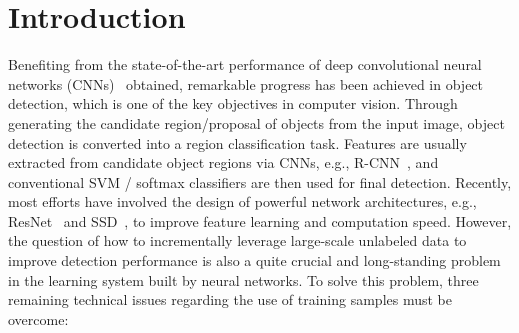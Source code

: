 \documentclass[journal]{IEEEtran}
\begin{document}
 \section{Introduction}
Benefiting from the state-of-the-art performance of deep convolutional neural networks (CNNs)~\cite{alexnet12NIPS,googlenet,He_2016_CVPR} obtained, remarkable progress has been achieved in object detection, which is one of the key objectives in computer vision. Through generating the candidate region/proposal of objects from the input image, object detection is converted into a region classification task. Features are usually extracted from candidate object regions via CNNs, e.g., R-CNN~\cite{rcnn14CVPR}, and conventional SVM / softmax classifiers are then used for final detection. Recently, most efforts have involved the design of powerful network architectures, e.g., ResNet~\cite{He_2016_CVPR} and SSD~\cite{ssd16ECCV}, to improve feature learning and computation speed. However, the question of how to {incrementally leverage large-scale unlabeled data to improve} detection performance is also a quite crucial and long-standing problem in {the learning system built by neural networks}. To solve this problem, three remaining technical issues regarding the use of training samples must be overcome: 
\end{document}
